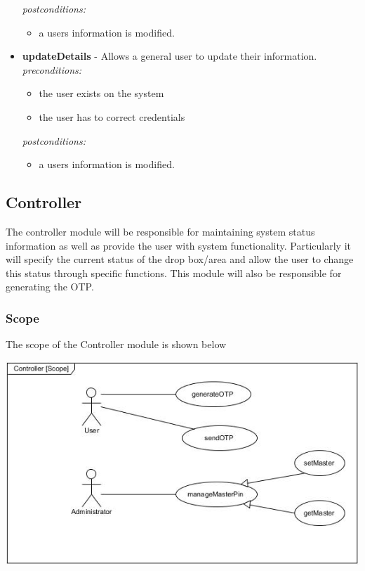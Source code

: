 \documentclass[a4paper,12pt]{article}
\begin{document}
\begin{itemize}
		\textit{postconditions:}
			\begin{itemize}
				\item a users information is modified.\\[0.5cm]
			\end{itemize}
			
		\item \textbf{updateDetails} - Allows a general user to update their information.\\[0.5cm]
		\textit{preconditions:}
			\begin{itemize}
				\item the user exists on the system
				\item the user has to correct credentials
			\end{itemize}
		
		\textit{postconditions:}
			\begin{itemize}
				\item a users information is modified.
			\end{itemize}
	\end{itemize}
	
	\newpage
	\subsection{Controller}
	The controller module will be responsible for maintaining system status information as well as provide the user with system functionality. Particularly it will specify the current status of the drop box/area and allow the user to change this status through specific functions. This module will also be responsible for generating the OTP.
	
	\subsubsection{Scope}
	The scope of the Controller module is shown below
	
	\includegraphics[width=1\textwidth]{./Pictures/UML/controllerScope.jpg}\\[1.5cm]
	
\end{document}
